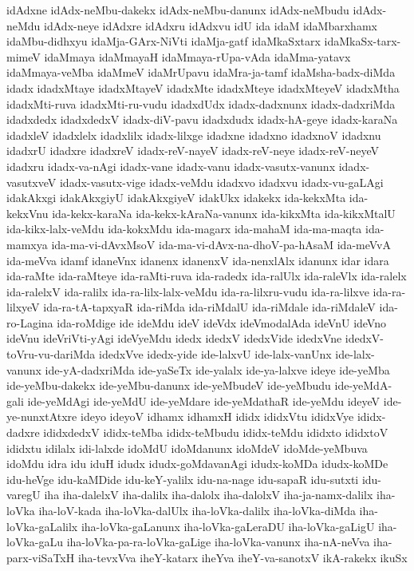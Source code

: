 {idAdxne
idAdx-neMbu-dakekx
idAdx-neMbu-danunx
idAdx-neMbudu
idAdx-neMdu
idAdx-neye
idAdxre
idAdxru
idAdxvu
idU
ida
idaM
idaMbarxhamx
idaMbu-didhxyu
idaMja-GArx-NiVti
idaMja-gatf
idaMkaSxtarx
idaMkaSx-tarx-mimeV
idaMmaya
idaMmayaH
idaMmaya-rUpa-vAda
idaMma-yatavx
idaMmaya-veMba
idaMmeV
idaMrUpavu
idaMra-ja-tamf
idaMsha-badx-diMda
idadx
idadxMtaye
idadxMtayeV
idadxMte
idadxMteye
idadxMteyeV
idadxMtha
idadxMti-ruva
idadxMti-ru-vudu
idadxdUdx
idadx-dadxnunx
idadx-dadxriMda
idadxdedx
idadxdedxV
idadx-diV-pavu
idadxdudx
idadx-hA-geye
idadx-karaNa
idadxleV
idadxlelx
idadxlilx
idadx-lilxge
idadxne
idadxno
idadxnoV
idadxnu
idadxrU
idadxre
idadxreV
idadx-reV-nayeV
idadx-reV-neye
idadx-reV-neyeV
idadxru
idadx-va-nAgi
idadx-vane
idadx-vanu
idadx-vasutx-vanunx
idadx-vasutxveV
idadx-vasutx-vige
idadx-veMdu
idadxvo
idadxvu
idadx-vu-gaLAgi
idakAkxgi
idakAkxgiyU
idakAkxgiyeV
idakUkx
idakekx
ida-kekxMta
ida-kekxVnu
ida-kekx-karaNa
ida-kekx-kAraNa-vanunx
ida-kikxMta
ida-kikxMtalU
ida-kikx-lalx-veMdu
ida-kokxMdu
ida-magarx
ida-mahaM
ida-ma-maqta
ida-mamxya
ida-ma-vi-dAvxMsoV
ida-ma-vi-dAvx-na-dhoV-pa-hAsaM
ida-meVvA
ida-meVva
idamf
idaneVnx
idanenx
idanenxV
ida-nenxlAlx
idanunx
idar
idara
ida-raMte
ida-raMteye
ida-raMti-ruva
ida-radedx
ida-ralUlx
ida-raleVlx
ida-ralelx
ida-ralelxV
ida-ralilx
ida-ra-lilx-lalx-veMdu
ida-ra-lilxru-vudu
ida-ra-lilxve
ida-ra-lilxyeV
ida-ra-tA-tapxyaR
ida-riMda
ida-riMdalU
ida-riMdale
ida-riMdaleV
ida-ro-Lagina
ida-roMdige
ide
ideMdu
ideV
ideVdx
ideVmodalAda
ideVnU
ideVno
ideVnu
ideVriVti-yAgi
ideVyeMdu
idedx
idedxV
idedxVide
idedxVne
idedxV-toVru-vu-dariMda
idedxVve
idedx-yide
ide-lalxvU
ide-lalx-vanUnx
ide-lalx-vanunx
ide-yA-dadxriMda
ide-yaSeTx
ide-yalalx
ide-ya-lalxve
ideye
ide-yeMba
ide-yeMbu-dakekx
ide-yeMbu-danunx
ide-yeMbudeV
ide-yeMbudu
ide-yeMdA-gali
ide-yeMdAgi
ide-yeMdU
ide-yeMdare
ide-yeMdathaR
ide-yeMdu
ideyeV
ide-ye-nunxtAtxre
ideyo
ideyoV
idhamx
idhamxH
ididx
ididxVtu
ididxVye
ididx-dadxre
ididxdedxV
ididx-teMba
ididx-teMbudu
ididx-teMdu
ididxto
ididxtoV
ididxtu
idilalx
idi-lalxde
idoMdU
idoMdanunx
idoMdeV
idoMde-yeMbuva
idoMdu
idra
idu
iduH
idudx
idudx-goMdavanAgi
idudx-koMDa
idudx-koMDe
idu-heVge
idu-kaMDide
idu-keY-yalilx
idu-na-nage
idu-sapaR
idu-sutxti
idu-varegU
iha
iha-dalelxV
iha-dalilx
iha-dalolx
iha-dalolxV
iha-ja-namx-dalilx
iha-loVka
iha-loV-kada
iha-loVka-dalUlx
iha-loVka-dalilx
iha-loVka-diMda
iha-loVka-gaLalilx
iha-loVka-gaLanunx
iha-loVka-gaLeraDU
iha-loVka-gaLigU
iha-loVka-gaLu
iha-loVka-pa-ra-loVka-gaLige
iha-loVka-vanunx
iha-nA-neVva
iha-parx-viSaTxH
iha-tevxVva
iheY-katarx
iheYva
iheY-va-sanotxV
ikA-rakekx
ikuSx
}
